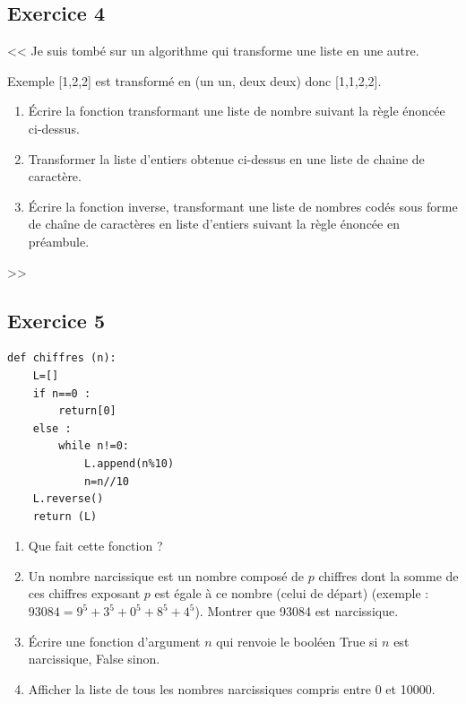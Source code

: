 \documentclass[10pt,fleqn]{article} %
\begin{document}
\begin{multicols}{2}
\subsection*{Exercice 4}
<< Je suis tombé sur un algorithme qui transforme une liste en une autre. 

Exemple [1,2,2] est transformé en (un un, deux deux) donc [1,1,2,2].

\begin{enumerate}
\item Écrire la fonction transformant une liste de nombre suivant la règle énoncée ci-dessus.
\item Transformer la liste d'entiers obtenue ci-dessus en une liste de chaine de caractère.
\item Écrire la fonction inverse, transformant une liste de nombres codés sous forme de chaîne de caractères en liste d'entiers suivant la règle énoncée en préambule.
\end{enumerate}
>>



\subsection*{Exercice 5}
\begin{py}
\begin{lstlisting}
def chiffres (n):
    L=[]
    if n==0 : 
        return[0]
    else : 
        while n!=0:
            L.append(n%10)
            n=n//10
    L.reverse()
    return (L)        
\end{lstlisting}
\end{py}


\begin{enumerate}
\item Que fait cette fonction ?
\item Un nombre narcissique est un nombre composé de $p$ chiffres dont la somme de ces chiffres exposant $p$ est égale à ce nombre (celui de départ) (exemple : $93084 = 9^5 + 3^5 + 0^5 + 8 ^5 + 4^5$). Montrer que 93084 est narcissique.
\item Écrire une fonction d'argument $n$ qui renvoie le booléen True si $n$ est narcissique, False sinon.
\item Afficher la liste de tous les nombres narcissiques compris entre 0 et 10000.
\end{enumerate}


\end{multicols}
\end{document}
